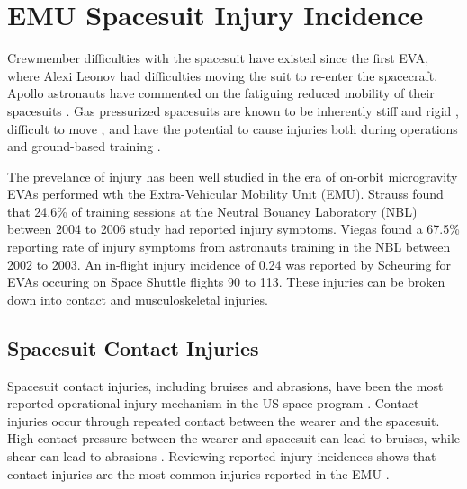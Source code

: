 \documentclass[defaultstyle,11pt]{comps}
\begin{document}
\hypertarget{emu-spacesuit-injury-incidence}{%
\section{EMU Spacesuit Injury Incidence}\label{emu-spacesuit-injury-incidence}}

Crewmember difficulties with the spacesuit have existed since the first EVA, where Alexi Leonov had difficulties moving the suit to re-enter the spacecraft.
Apollo astronauts have commented on the fatiguing reduced mobility of their spacesuits \citep{Scheuring2008}.
Gas pressurized spacesuits are known to be inherently stiff and rigid \citep{Parry1966, Abramov1994, Schmidt2001a, Holschuh2009}, difficult to move \citep{Norcross2009, Amick2015}, and have the potential to cause injuries both during operations and ground-based training \citep{Williams2003, Strauss2004, Scheuring2008, Scheuring2009, Chappell2017}.

The prevelance of injury has been well studied in the era of on-orbit microgravity EVAs performed wth the Extra-Vehicular Mobility Unit (EMU).
Strauss \citep{Strauss2004} found that 24.6\% of training sessions at the Neutral Bouancy Laboratory (NBL) between 2004 to 2006 study had reported injury symptoms.
Viegas \citep{Viegas2004} found a 67.5\% reporting rate of injury symptoms from astronauts training in the NBL between 2002 to 2003.
An in-flight injury incidence of 0.24 was reported by Scheuring \citep{Scheuring2012} for EVAs occuring on Space Shuttle flights 90 to 113.
These injuries can be broken down into contact and musculoskeletal injuries.

\hypertarget{spacesuit-contact-injuries}{%
\subsection{Spacesuit Contact Injuries}\label{spacesuit-contact-injuries}}

Spacesuit contact injuries, including bruises and abrasions, have been the most reported operational injury mechanism in the US space program \citep{Scheuring2008}.
Contact injuries occur through repeated contact between the wearer and the
spacesuit.
High contact pressure between the wearer and spacesuit can lead to bruises, while shear can lead to abrasions \citep{Mailler2004, Carlson2006}.
Reviewing reported injury incidences shows that contact injuries are the most common injuries reported in the EMU \citep{Strauss2004, Viegas2004, Scheuring2012}.
\end{document}
